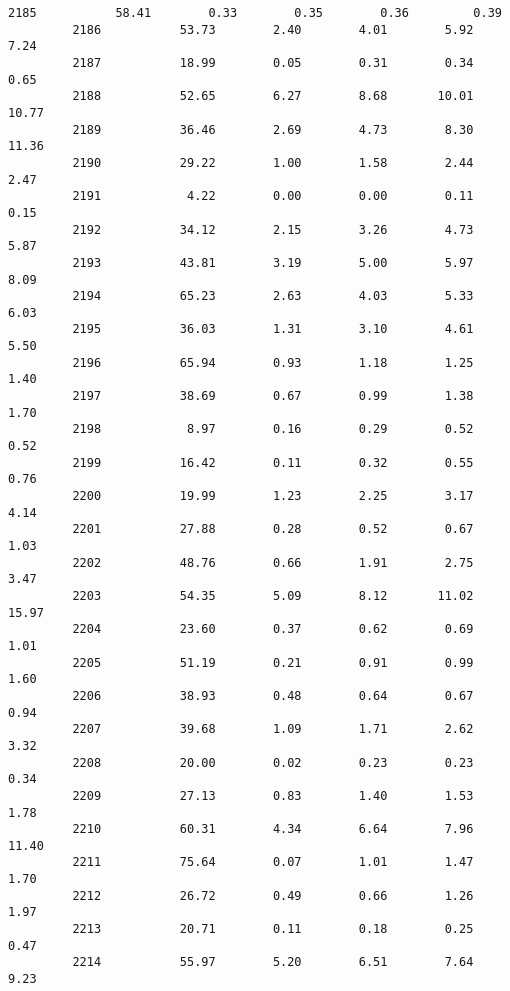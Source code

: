 \documentclass[11pt]{llncs}
\begin{document}
\begin{Verbatim}[commandchars=\\\{\}]
         2185           58.41        0.33        0.35        0.36         0.39   
         2186           53.73        2.40        4.01        5.92         7.24   
         2187           18.99        0.05        0.31        0.34         0.65   
         2188           52.65        6.27        8.68       10.01        10.77   
         2189           36.46        2.69        4.73        8.30        11.36   
         2190           29.22        1.00        1.58        2.44         2.47   
         2191            4.22        0.00        0.00        0.11         0.15   
         2192           34.12        2.15        3.26        4.73         5.87   
         2193           43.81        3.19        5.00        5.97         8.09   
         2194           65.23        2.63        4.03        5.33         6.03   
         2195           36.03        1.31        3.10        4.61         5.50   
         2196           65.94        0.93        1.18        1.25         1.40   
         2197           38.69        0.67        0.99        1.38         1.70   
         2198            8.97        0.16        0.29        0.52         0.52   
         2199           16.42        0.11        0.32        0.55         0.76   
         2200           19.99        1.23        2.25        3.17         4.14   
         2201           27.88        0.28        0.52        0.67         1.03   
         2202           48.76        0.66        1.91        2.75         3.47   
         2203           54.35        5.09        8.12       11.02        15.97   
         2204           23.60        0.37        0.62        0.69         1.01   
         2205           51.19        0.21        0.91        0.99         1.60   
         2206           38.93        0.48        0.64        0.67         0.94   
         2207           39.68        1.09        1.71        2.62         3.32   
         2208           20.00        0.02        0.23        0.23         0.34   
         2209           27.13        0.83        1.40        1.53         1.78   
         2210           60.31        4.34        6.64        7.96        11.40   
         2211           75.64        0.07        1.01        1.47         1.70   
         2212           26.72        0.49        0.66        1.26         1.97   
         2213           20.71        0.11        0.18        0.25         0.47   
         2214           55.97        5.20        6.51        7.64         9.23   
         

\end{Verbatim}
\end{document}
